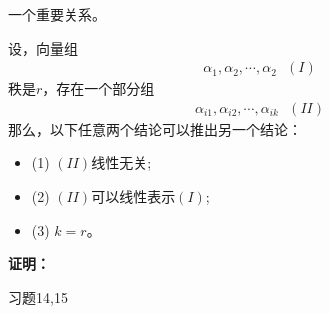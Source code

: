\documentclass{article}
\begin{document}
\begin{zremark}
  一个重要关系。

  设，向量组
  \begin{align*}
    \alpha_1, \alpha_2, \cdots, \alpha_2 \ \ \ (I)
  \end{align*}
  秩是$r$，存在一个部分组
  \begin{align*}
    \alpha_{i1}, \alpha_{i2}, \cdots, \alpha_{ik} \ \ \ (II)
  \end{align*}
  那么，以下任意两个结论可以推出另一个结论：
  \begin{itemize}
    \item (1) $(II)$线性无关;
    \item (2) $(II)$可以线性表示$(I)$;
    \item (3) $k = r$。
  \end{itemize}
\end{zremark}

\textbf{证明：}

习题14,15
\end{document}
